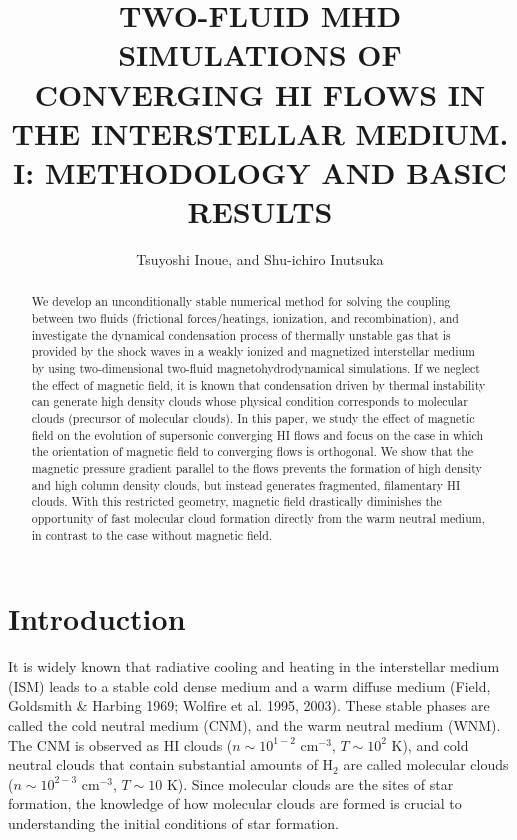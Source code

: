 \documentclass[12pt,preprint]{aastex}
\begin{document}
\title{
TWO-FLUID MHD SIMULATIONS OF CONVERGING HI FLOWS IN THE INTERSTELLAR MEDIUM. I: METHODOLOGY AND BASIC RESULTS
}
\author{Tsuyoshi Inoue, and Shu-ichiro Inutsuka}

\begin{abstract}
We develop an unconditionally stable numerical method for solving the coupling between two fluids (frictional forces/heatings, ionization, and recombination), and investigate the dynamical condensation process of thermally unstable gas that is provided by the shock waves in a weakly ionized and magnetized interstellar medium by using two-dimensional two-fluid magnetohydrodynamical simulations.
If we neglect the effect of magnetic field, it is known that condensation driven by thermal instability can generate high density clouds whose physical condition corresponds to molecular clouds (precursor of molecular clouds).
In this paper, we study the effect of magnetic field on the evolution of supersonic converging HI flows and focus on the case in which the orientation of magnetic field to converging flows is orthogonal.
We show that the magnetic pressure gradient parallel to the flows prevents the formation of high density and high column density clouds, but instead generates fragmented, filamentary HI clouds.
With this restricted geometry, magnetic field drastically diminishes the opportunity of fast molecular cloud formation directly from the warm neutral medium, in contrast to the case without magnetic field.
\end{abstract}


\section{Introduction}
It is widely known that radiative cooling and heating in the interstellar medium (ISM) leads to a stable cold dense medium and a warm diffuse medium (Field, Goldsmith \& Harbing 1969; Wolfire et al. 1995, 2003).
These stable phases are called the cold neutral medium (CNM), and the warm neutral medium (WNM).
The CNM is observed as HI clouds ($n \sim 10^{1-2}$ cm$^{-3}$, $T\sim 10^{2}$ K), and cold neutral clouds that contain substantial amounts of H$_{2}$ are called molecular clouds ($n \sim 10^{2-3}$ cm$^{-3}$, $T\sim 10$ K).
Since molecular clouds are the sites of star formation, the knowledge of how molecular clouds are formed is crucial to understanding the initial conditions of star formation.
\end{document}
